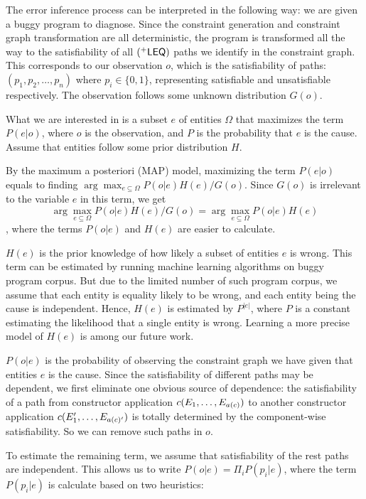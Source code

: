 The error inference process can be interpreted in the following way:
we are given a buggy program to diagnose. Since the constraint
generation and constraint graph transformation are all deterministic,
the program is transformed all the way to the satisfiability of all
$(^{+}\mathsf{LEQ})$ paths we identify in the constraint graph. This
corresponds to our observation $o$, which is the satisfiability of
paths: $(p_1, p_2, \dots, p_n)$ where $p_i\in \{0, 1\}$, representing
satisfiable and unsatisfiable respectively.  The observation follows
some unknown distribution $G(o)$.

What we are interested in is a subset $e$ of entities $\Omega$ that
maximizes the term $P(e|o)$, where $o$ is the observation, and $P$ is
the probability that $e$ is the cause. Assume that entities follow some
prior distribution $H$.

By the maximum a posteriori (MAP) model, maximizing the term $P(e|o)$
equals to finding $\arg\max_{e \subseteq \Omega} P(o|e) H(e) / G(o)$.
Since $G(o)$ is irrelevant to the variable $e$ in this term, we get
\[\arg\max_{e \subseteq \Omega} P(o|e) H(e) / G(o) =  \arg\max_{e
\subseteq \Omega} P(o|e) H(e)\] , where the terms $P(o|e)$ and $H(e)$
are easier to calculate.

$H(e)$ is the prior knowledge of how likely a subset of entities $e$ is
wrong. This term can be estimated by running machine learning algorithms on
buggy program corpus. But due to the limited number of such program corpus, we
assume that each entity is equality likely to be wrong, and each
entity being the cause is independent. Hence, $H(e)$ is estimated by
$P^{|e|}$, where $P$ is a constant estimating the likelihood that a
single entity is wrong. Learning a more precise model of $H(e)$ is
among our future work.

$P(o|e)$ is the probability of observing the constraint graph we have
given that entities $e$ is the cause.
%
Since the satisfiability of different paths may be dependent, we first
eliminate one obvious source of dependence: the satisfiability of a
path from constructor application $c(E_1, \dots, E_{a(c)})$ to
another constructor application $c(E_1', \dots, E_{a(c)'})$ is
totally determined by the component-wise satisfiability. So we can
remove such paths in $o$.

To estimate the remaining term, we assume that satisfiability of the
rest paths are independent. This allows us to write $P(o|e) = \Pi_i
P(p_i|e)$, where the term $P(p_i|e)$ is calculate based on two
heuristics:

